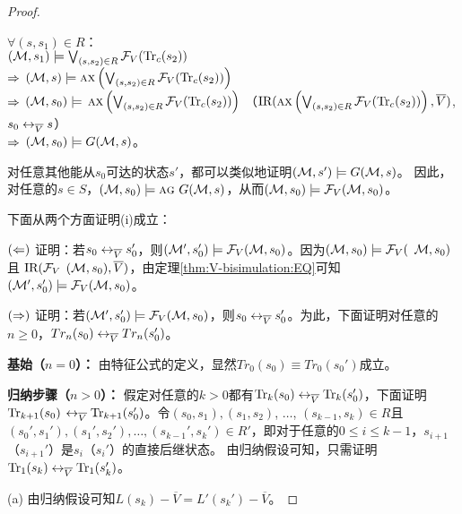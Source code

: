 \begin{proof}
\begin{itemize}
		$\forall (s, s_1) \in R$：\\
		$({\cal M}, s_1) \models \bigvee_{(s, s_2)\in R}{\cal F}_V(\textrm{Tr}_c(s_2))$\\
		$\Rightarrow$ $({\cal M}, s) \models \textsc{a} \textsc{x} \left( \bigvee_{(s, s_2)\in R} {\cal F}_V(\textrm{Tr}_c(s_2)) \right)$ \\
		$\Rightarrow$ $({\cal M}, s_0) \models$  $\textsc{a} \textsc{x} \left( \bigvee_{(s, s_2)\in R} {\cal F}_V(\textrm{Tr}_c(s_2)) \right)$     （$\textrm{IR}(\textsc{a} \textsc{x} \left( \bigvee_{(s, s_2)\in R} {\cal F}_V(\textrm{Tr}_c(s_2)) \right), \overline V)$, $s_0 \leftrightarrow_{\overline V} s$）\\
		$\Rightarrow$ $({\cal M}, s_0) \models G({\cal M}, s)$。\\
	\end{itemize}
	
	对任意其他能从$s_0$可达的状态$s'$，都可以类似地证明$({\cal M},s')\models G({\cal M}, s)$。
	因此，对任意的$s\in S$，$({\cal M}, s_0) \models \textsc{a}\textsc{g}\ G({\cal M}, s)$，从而$({\cal M}, s_0) \models {\cal F}_V({\cal M}, s_0)$。
	
	下面从两个方面证明(i)成立：
	
	$(\Leftarrow)$ 证明：若$s_0 \leftrightarrow_{\overline V} s_0'$，则$({\cal M}',s_0') \models {\cal F}_V({\cal M},s_0)$。因为$({\cal M}, s_0) \models {\cal F}_V($ ${\cal M}, s_0)$且 $\textrm{IR}({\cal F}_V$ $({\cal M}, s_0), \overline V)$，由定理\ref{thm:V-bisimulation:EQ}可知
	$({\cal M}',s_0') \models {\cal F}_V({\cal M},s_0)$。
	
	$(\Rightarrow)$ 证明：若$({\cal M}',s_0') \models {\cal F}_V({\cal M},s_0)$，则$s_0 \leftrightarrow_{\overline V} s_0'$。为此，下面证明对任意的$n \geq 0$，$Tr_n(s_0) \leftrightarrow_{\overline V} Tr_n(s_0')$。
	
	
	\textbf{基始（$n=0$）：} 由特征公式的定义，显然$Tr_0(s_0) \equiv Tr_0(s_0')$成立。
	
	\textbf{归纳步骤（$n>0$）：} 假定对任意的$k > 0$都有$\textrm{Tr}_k(s_0) \leftrightarrow_{\overline V} \textrm{Tr}_k(s_0')$，下面证明$\textrm{Tr}_{k+1}(s_0)$ $\leftrightarrow_{\overline V} \textrm{Tr}_{k+1}(s_0')$。令$(s_0, s_1), (s_1, s_2)$, $\dots$, $(s_{k-1}, s_k) \in R$且$(s_0', s_1'), (s_1', s_2'), \dots, (s_{k-1}', s_k') \in R'$，即对于任意的$0 \leq i \leq k-1$，$s_{i+1}$（$s_{i+1}'$）是$s_i$（$s_i'$）的直接后继状态。
	由归纳假设可知，只需证明$\textrm{Tr}_1(s_k) \leftrightarrow_{\overline V} \textrm{Tr}_1(s_k')$。
	
	(a) 由归纳假设可知$L(s_k) - \overline V = L'(s_k') - \overline V$。
	

\end{proof}
